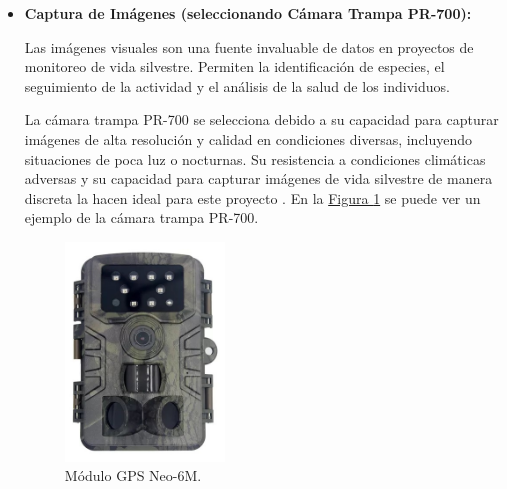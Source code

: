 \begin{itemize}
\item \textbf{Captura de Imágenes (seleccionando Cámara Trampa PR-700):}

Las imágenes visuales son una fuente invaluable de datos en proyectos de monitoreo de vida silvestre. Permiten la identificación de especies, el seguimiento de la actividad y el análisis de la salud de los individuos.

La cámara trampa PR-700 se selecciona debido a su capacidad para capturar imágenes de alta resolución y calidad en condiciones diversas, incluyendo situaciones de poca luz o nocturnas. Su resistencia a condiciones climáticas adversas y su capacidad para capturar imágenes de vida silvestre de manera discreta la hacen ideal para este proyecto \cite{99}. En la \hyperref[camara]{Figura \ref{camara}} se puede ver un ejemplo de la cámara trampa PR-700.
\begin{figure}[H]
  \centering
  \includegraphics[width=0.4\textwidth, height=0.35 \textwidth]{imagenes/camara.jpg}
  \caption{Módulo GPS Neo-6M.}
  \label{camara}
\end{figure}

 
 \end{itemize}

